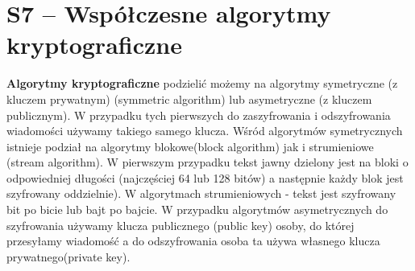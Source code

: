 \section{S7 -- Współczesne algorytmy kryptograficzne}

\textbf{Algorytmy kryptograficzne} podzielić możemy na algorytmy symetryczne (z kluczem prywatnym) (symmetric algorithm) lub asymetryczne (z kluczem publicznym). W przypadku tych pierwszych do zaszyfrowania i odszyfrowania wiadomości używamy takiego samego klucza. Wśród algorytmów symetrycznych istnieje podział na algorytmy blokowe(block algorithm) jak i strumieniowe (stream algorithm). W pierwszym przypadku tekst jawny dzielony jest na bloki o odpowiedniej długości (najczęściej 64 lub 128 bitów) a następnie każdy blok jest szyfrowany oddzielnie). W algorytmach strumieniowych - tekst jest szyfrowany bit po bicie lub bajt po bajcie. W przypadku algorytmów asymetrycznych do szyfrowania używamy klucza publicznego (public key) osoby, do której przesyłamy wiadomość a do odszyfrowania osoba ta używa własnego klucza prywatnego(private key).

